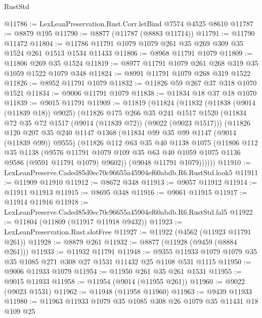 \begin{lexlean}{RustStd}
\begin{coremodule}
@11786 := LexLeanPreservation.Rust.Corr.letBind @7574 @4525 @8610
@11787 := @8879 @195
@11790 := @8877 (@11787 (@8883 @11714))
@11791 := @11790 @11472
@11804 := @11786 @11791 @1079 @1079 @261 @35 @269 @309 @35 @1524 @261 @1513 @1534 @11433
@11806 := @8968 @11791 @1079
@11809 := @11806 @269 @35 @1524
@11819 := @8977 @11791 @1079 @261 @268 @319 @35 @1059 @1522 @1079 @348
@11824 := @8991 @11791 @1079 @268 @319 @1522
@11826 := @8952 @11791 @1079
@11832 := @11826 @59 @267 @37 @318 @1070 @1521
@11834 := @9006 @11791 @1079
@11838 := @11834 @18 @37 @18 @1070
@11839 := @9015 @11791
@11909 := @11819
    (@11824
      (@11832
        (@11838 (@9014 (@11839 @18)) @9025)
        (@11826
          @175
          @266
          @35
          @241
          @1517
          @1520
          (@11834 @72 @35 @72 @1517 (@9014 (@11839 @72)) (@9022 (@9023 @1517)))
          (@11826
            @120
            @207
            @35
            @240
            @1147
            @1368
            (@11834 @99 @35 @99 @1147 (@9014 (@11839 @99)) @9555)
            (@11826
              @112
              @63
              @35
              @40
              @1138
              @1075
              (@11806
                @112
                @35
                @1138
                (@9576
                  @11791
                  @1079
                  @109
                  @35
                  @63
                  @40
                  @1059
                  @1075
                  @1136
                  @9586
                  (@9591 @11791 @1079)
                  @9602))
              (@9048 @11791 @1079))))))
@11910 := LexLeanPreserve.Caded85d0ec70c96655a45904ef60abdb.R6.RustStd.look5
@11911 := @11909 @11910
@11912 := @8672 @348
@11913 := @9057 @11912
@11914 := @11911 @11913
@11915 := @8695 @348
@11916 := @9061 @11915
@11917 := @11914 @11916
@11918 := LexLeanPreserve.Caded85d0ec70c96655a45904ef60abdb.R6.RustStd.fal5
@11922 := @11804 (@11809 (@11917 @11918 @9432))
@11923 := LexLeanPreservation.Rust.slotFree
@11927 := @11922 (@4562 (@11923 @11791 @261))
@11928 := @8879 @261
@11932 := @8877 (@11928 (@9459 (@8884 @261)))
@11933 := @11932 @11791
@11948 := @9355 @11933 @1079 @1079 @35 @35 @1085 @271 @308 @27 @1531 @11432 @25 @1108 @531 @1115
@11950 := @9006 @11933 @1079
@11954 := @11950 @261 @35 @261 @1531
@11955 := @9015 @11933
@11958 := @11954 (@9014 (@11955 @261))
@11960 := @9022 (@9023 @1531)
@11962 := @11948 (@11958 @11960)
@11963 := @9439 @11933
@11980 := @11963
    @11933
    @1079
    @35
    @1085
    @308
    @26
    @1079
    @35
    @11431
    @18
    @109
    @25

\end{coremodule}
\end{lexlean}
